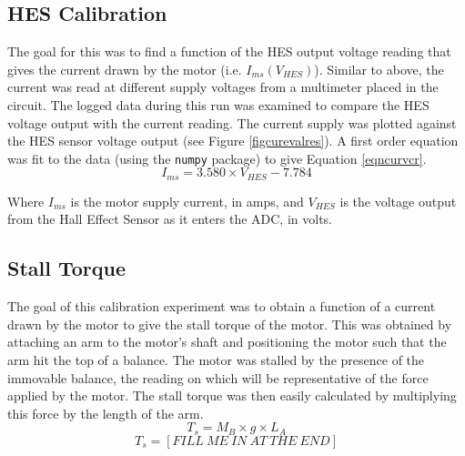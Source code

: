 \documentclass[twoside,a4]{report}
\begin{document}
	
	\subsection*{HES Calibration}
	The goal for this was to find a function of the HES output voltage reading that gives the current drawn by the motor (i.e. \(I_{ms} ({V_{HES}})\)). Similar to above, the current was read at different supply voltages from a multimeter placed in the circuit. The logged data during this run was examined to compare the HES voltage output with the current reading. The current supply was plotted against the HES sensor voltage output (see Figure \ref{figcurevalres}). A first order equation was fit to the data (using the \texttt{numpy} package) to give Equation \ref{eqncurvcr}.
	\begin{equation}
		I_{ms} = 3.580 \times {V_{HES}} - 7.784
		\label{eqncurvcr}
	\end{equation}
	
	
	\noindent
	Where \(I_{ms}\) is the motor supply current, in amps, and \(V_{HES}\) is the voltage output from the Hall Effect Sensor as it enters the ADC, in volts.
	
	\subsection*{Stall Torque}
	The goal of this calibration experiment was to obtain a function of a current drawn by the motor to give the stall torque of the motor. This was obtained by attaching an arm to the motor's shaft and positioning the motor such that the arm hit the top of a balance. The motor was stalled by the presence of the immovable balance, the reading on which will be representative of the force applied by the motor. The stall torque was then easily calculated by multiplying this force by the length of the arm.
	\begin{equation}
		T_s = M_B \times g \times L_A
		\label{eqntscalc}
	\end{equation}
	\begin{equation}
		T_s = [ FILL\ ME\ IN\ AT\ THE\ END]
		\label{eqntsemp}
	\end{equation}
	
	
\end{document}

